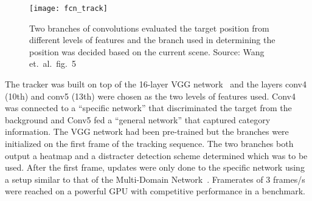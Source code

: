 \begin{figure}[H]
\centering
\texttt{[image: fcn\_track]}
\caption{Two branches of convolutions evaluated the target position from different
         levels of features and the branch used in determining the position was decided
         based on the current scene. Source: Wang et.~al.~fig.~5~\cite{FCN_TRACK_2}}\label{fig:mdnet}
\end{figure}

The tracker was built on top of the 16-layer VGG network~\cite{VGG} and the layers
conv4 (10th) and conv5 (13th) were chosen as the two
levels of features used. Conv4 was connected to a ``specific network''
that discriminated the target from the background and Conv5 fed a
``general network'' that captured category information. The VGG network had been
pre-trained but the branches were initialized on the first frame of the tracking
sequence. The two branches both output a heatmap and a distracter detection scheme
determined which was to be used. After the first frame, updates were only done to
the specific network using a setup similar to that of the Multi-Domain Network~\cite{MDNET}.
Framerates of 3 frames/s were reached on a powerful GPU with competitive performance in
a benchmark.~\cite{FCN_TRACK_2}

